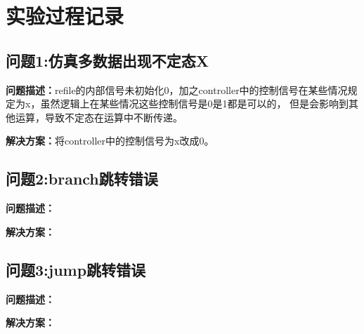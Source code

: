 \section{实验过程记录}
\subsection{问题1:仿真多数据出现不定态X}
\textbf{问题描述：}refile的内部信号未初始化0，加之controller中的控制信号在某些情况规定为x，虽然逻辑上在某些情况这些控制信号是0是1都是可以的，
但是会影响到其他运算，导致不定态在运算中不断传递。

\textbf{解决方案：}将controller中的控制信号为x改成0。
\subsection{问题2:branch跳转错误}
\textbf{问题描述：}

\textbf{解决方案：}
\subsection{问题3:jump跳转错误}
\textbf{问题描述：}

\textbf{解决方案：}
